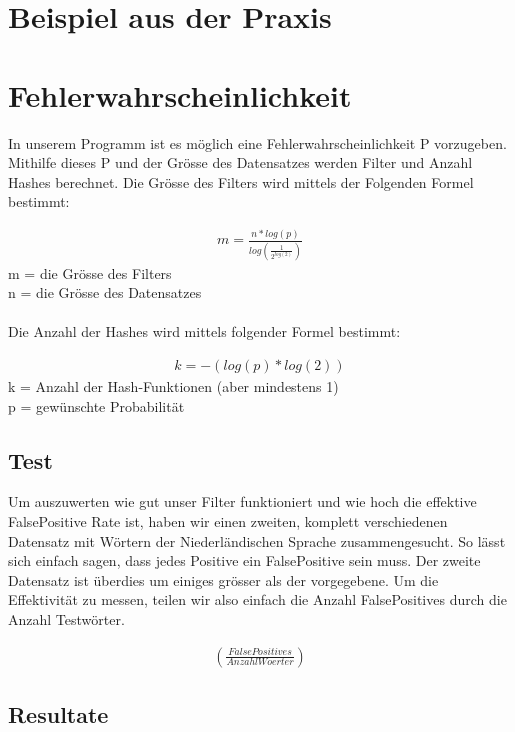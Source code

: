 \documentclass[11pt]{article}
\begin{document}
    \section{Beispiel aus der Praxis}

    \section{Fehlerwahrscheinlichkeit}
    In unserem Programm ist es m{\"o}glich eine Fehlerwahrscheinlichkeit P vorzugeben.
    Mithilfe dieses P und der Gr{\"o}sse des Datensatzes werden Filter und Anzahl Hashes berechnet.
    Die Gr{\"o}sse des Filters wird mittels der Folgenden Formel bestimmt:

     \begin{align*}
        m = \frac{n * log(p)}{log(\frac{1}{2^{log(2)}})}
    \end{align*}
    \smallskip
    m = die Gr{\"o}sse des Filters
    \\
    n = die Gr{\"o}sse des Datensatzes
    \\
    \\
    Die Anzahl der Hashes wird mittels folgender Formel bestimmt:

    \begin{align*}
        k = -(log(p) * log(2))
    \end{align*}
    \smallskip
    k = Anzahl der Hash-Funktionen (aber mindestens 1)
    \\
    p = gew{\"u}nschte Probabilit{\"a}t
    \medskip

    \subsection{Test}
    Um auszuwerten wie gut unser Filter funktioniert und wie hoch die effektive FalsePositive Rate ist,
    haben wir einen zweiten, komplett verschiedenen Datensatz mit W{\"o}rtern der Niederl{\"a}ndischen Sprache zusammengesucht.
    So l{\"a}sst sich einfach sagen, dass jedes Positive ein FalsePositive sein muss. Der zweite Datensatz ist {\"u}berdies um einiges
    gr{\"o}sser als der vorgegebene. Um die Effektivit{\"a}t zu messen, teilen wir also einfach die Anzahl FalsePositives durch die Anzahl
    Testw{\"o}rter.

    \begin{align*}
    (\frac{False Positives}{Anzahl Woerter})
    \end{align*}

    \subsection{Resultate}
\end{document}

